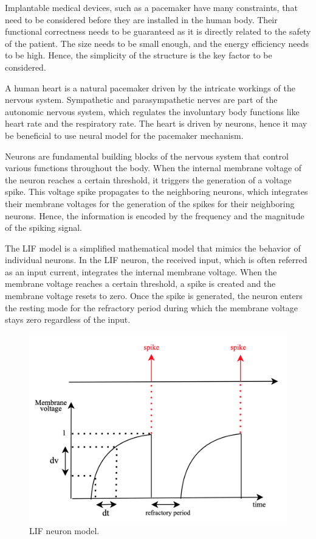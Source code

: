 \documentclass[conference]{IEEEtran}
\begin{document}
Implantable medical devices, such as a pacemaker have many constraints, that need to be considered before they are installed in the human body. Their functional correctness needs to be guaranteed as it is directly related to the safety of the patient. The size needs to be small enough, and the energy efficiency needs to be high. Hence, the simplicity of the structure is the key factor to be considered.

A human heart is a natural pacemaker driven by the intricate workings of the nervous system. Sympathetic and parasympathetic nerves are part of the autonomic nervous system, which regulates the involuntary body functions like heart rate and the respiratory rate. The heart is driven by neurons, hence it may be beneficial to use neural model for the pacemaker mechanism.

Neurons are fundamental building blocks of the nervous system that control various functions throughout the body. When the internal membrane voltage of the neuron reaches a certain threshold, it triggers the generation of a voltage spike. This voltage spike propagates to the neighboring neurons, which integrates their membrane voltages for the generation of the spikes for their neighboring neurons. Hence, the information is encoded by the frequency and the magnitude of the spiking signal. 

The LIF model is a simplified mathematical model that mimics the behavior of individual neurons. In the LIF neuron, the received input, which is often referred as an input current, integrates the internal membrane voltage. When the membrane voltage reaches a certain threshold, a spike is created and the membrane voltage resets to zero. Once the spike is generated, the neuron enters the resting mode for the refractory period during which the membrane voltage stays zero regardless of the input.


\begin{figure}[htbp]
	\centerline{\includegraphics[scale=0.25]{./fig/lif.png}}
	\caption{LIF neuron model.}
	\label{lif}
\end{figure}
\end{document}
